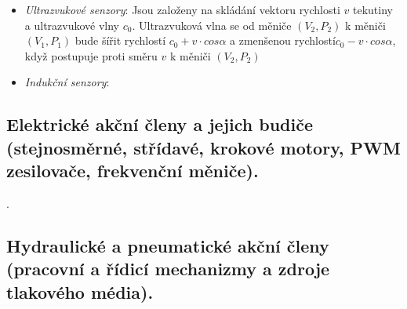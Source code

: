 \begin{itemize}
\item \textit{Ultrazvukové senzory}: Jsou založeny na skládání vektoru rychlosti $ v $ tekutiny a ultrazvukové vlny $ c_0 $. Ultrazvuková vlna se od měniče $ (V_2, P_2) $ k měniči $ (V_1, P_1) $ bude šířit rychlostí $ c_0 + v \cdot cos \alpha $ a zmenšenou rychlostí$ c_0 - v \cdot cos \alpha $, když postupuje proti směru $ v $ k měniči $ (V_2, P_2) $
\item \textit{Indukční senzory}: 
\end{itemize}

\newpage
\subsection{Elektrické akční členy a jejich budiče (stejnosměrné, střídavé, krokové motory, PWM zesilovače, frekvenční měniče).}

\newpage . \newpage
\subsection{Hydraulické a pneumatické akční členy (pracovní a řídicí mechanizmy a zdroje tlakového média).}